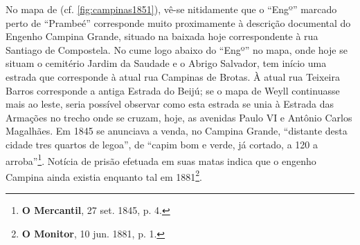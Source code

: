 No mapa de  (cf. \autoref{fig:campinas1851}), vê-se nitidamente que o ``Engº'' marcado perto de ``Prambeé'' corresponde muito proximamente à descrição documental do Engenho Campina Grande, situado na baixada hoje correspondente à rua Santiago de Compostela. No cume logo abaixo do ``Engº'' no mapa, onde hoje se situam  o cemitério Jardim da Saudade e o Abrigo Salvador, tem início uma estrada que corresponde à atual rua Campinas de Brotas. À atual rua Teixeira Barros corresponde a antiga Estrada do Beijú; se o mapa de Weyll continuasse mais ao leste, seria possível observar como esta estrada se unia à Estrada das Armações no trecho onde se cruzam, hoje, as avenidas Paulo VI e Antônio Carlos Magalhães. Em 1845 se anunciava a venda, no Campina Grande, ``distante desta cidade tres quartos de legoa'', de ``capim bom e verde, já cortado, a 120 a arroba''\footnote{\textbf{O Mercantil}, 27 set. 1845, p. 4.}. Notícia de prisão efetuada em suas matas indica que o engenho Campina ainda existia enquanto tal em 1881\footnote{\textbf{O Monitor}, 10 jun. 1881, p. 1.}.

